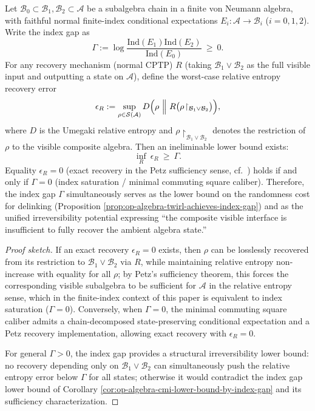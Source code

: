 \begin{proposition}\label{prop:op-algebra-minimal-sufficiency-gap-by-index}
Let \(\mathcal{B}_0\subset \mathcal{B}_1,\mathcal{B}_2\subset \mathcal{A}\) be a subalgebra chain in a finite von Neumann algebra, with faithful normal finite-index conditional expectations
\(
E_i:\mathcal{A}\to\mathcal{B}_i
\) (\(i=0,1,2\)).
Write the index gap as
\[
\Gamma:=\log\frac{\mathrm{Ind}(E_1)\mathrm{Ind}(E_2)}{\mathrm{Ind}(E_0)}\ \ge\ 0.
\]
For any recovery mechanism (normal CPTP) \(R\) (taking \(\mathcal{B}_1\vee\mathcal{B}_2\) as the full visible input and outputting a state on \(\mathcal{A}\)), define the worst-case relative entropy recovery error
\[
\epsilon_R:=\sup_{\rho\in\mathcal{S}(\mathcal{A})}
D\Bigl(\rho\ \Big\|\ R\bigl(\rho\!\upharpoonright_{\mathcal{B}_1\vee\mathcal{B}_2}\bigr)\Bigr),
\]
where \(D\) is the Umegaki relative entropy and \(\rho\!\upharpoonright_{\mathcal{B}_1\vee\mathcal{B}_2}\) denotes the restriction of \(\rho\) to the visible composite algebra.
Then an ineliminable lower bound exists:
\[
\boxed{\;
\inf_R\ \epsilon_R\ \ge\ \Gamma.\;}
\]
Equality \(\epsilon_R=0\) (exact recovery in the Petz sufficiency sense, cf.\ \cite{Petz1986SufficientSubalgebrasRelativeEntropy,Petz2003MonotonicityRelativeEntropyRevisited}) holds if and only if \(\Gamma=0\) (index saturation / minimal commuting square caliber).
Therefore, the index gap \(\Gamma\) simultaneously serves as the lower bound on the randomness cost for delinking (Proposition \ref{prop:op-algebra-twirl-achieves-index-gap}) and as the unified irreversibility potential expressing ``the composite visible interface is insufficient to fully recover the ambient algebra state.''
\end{proposition}
\begin{proof}[Proof sketch]
If an exact recovery \(\epsilon_R=0\) exists, then \(\rho\) can be losslessly recovered from its restriction to \(\mathcal{B}_1\vee\mathcal{B}_2\) via \(R\), while maintaining relative entropy non-increase with equality for all \(\rho\); by Petz's sufficiency theorem, this forces the corresponding visible subalgebra to be sufficient for \(\mathcal{A}\) in the relative entropy sense, which in the finite-index context of this paper is equivalent to index saturation (\(\Gamma=0\)).
Conversely, when \(\Gamma=0\), the minimal commuting square caliber admits a chain-decomposed state-preserving conditional expectation and a Petz recovery implementation, allowing exact recovery with \(\epsilon_R=0\).
\par
For general \(\Gamma>0\), the index gap provides a structural irreversibility lower bound: no recovery depending only on \(\mathcal{B}_1\vee\mathcal{B}_2\) can simultaneously push the relative entropy error below \(\Gamma\) for all states; otherwise it would contradict the index gap lower bound of Corollary \ref{cor:op-algebra-cmi-lower-bound-by-index-gap} and its sufficiency characterization. \qedhere
\end{proof}

\endinput

